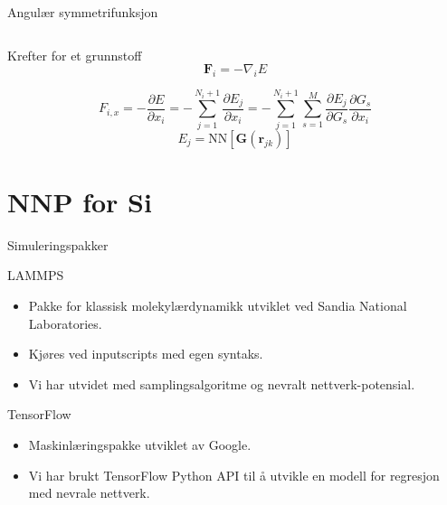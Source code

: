 \documentclass{beamer}
\begin{document}
\begin{frame}{Angulær symmetrifunksjon}
\begin{columns}
\begin{column}{0.5\linewidth}
  \end{column}
\end{columns}

\end{frame}


\begin{frame}

\begin{block}{Krefter for et grunnstoff}
 \begin{equation*}
  \mathbf{F}_i = -\nabla_i E
 \end{equation*}

 \begin{equation*}
  F_{i,x} = -\frac{\partial E}{\partial x_i} =
  -\sum_{j=1}^{N_i+1}\frac{\partial E_j}{\partial x_i} = 
  -\sum_{j=1}^{N_i+1}\sum_{s=1}^M\frac{\partial E_j}{\partial G_s}\frac{\partial G_s}{\partial x_i}
 \end{equation*}
 \begin{equation*}
  E_j = \mathrm{NN}[\mathbf{G}(\mathbf{r}_{jk})]
 \end{equation*}
\end{block}

\end{frame}


\section{NNP for Si}


\begin{frame}{Simuleringspakker}

\begin{block}{LAMMPS}
 \begin{itemize}
  \item Pakke for klassisk molekylærdynamikk utviklet ved Sandia National Laboratories. 
  \item Kjøres ved inputscripts med egen syntaks. 
  \item Vi har utvidet med samplingsalgoritme og nevralt nettverk-potensial.
 \end{itemize}
\end{block}

\begin{block}{TensorFlow}
 \begin{itemize}
  \item Maskinlæringspakke utviklet av Google. 
  \item Vi har brukt TensorFlow Python API til å utvikle en modell for regresjon med nevrale nettverk. 
 \end{itemize}
\end{block}

\end{frame}
\end{document}
